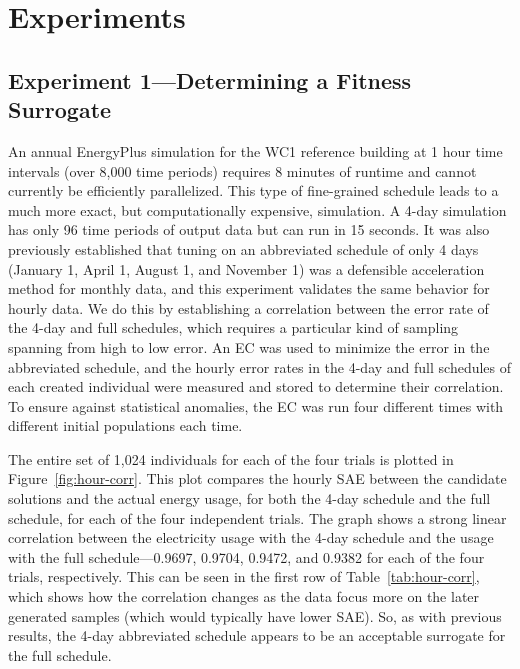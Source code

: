 \documentclass[preprint, review, 12pt]{elsarticle}
\begin{document}
\section{Experiments}
\label{sec:hourly}

\subsection{Experiment 1---Determining a Fitness Surrogate}
\label{sub:experiment1}
An annual EnergyPlus simulation for the WC1 reference building at 1 hour time intervals (over 8,000 time periods) requires 8 minutes of runtime and cannot currently be efficiently parallelized. This type of fine-grained schedule leads to a much more exact, but computationally expensive, simulation. A 4-day simulation has only 96 time periods of output data but can run in 15 seconds. It was also previously established \cite{cit:garrett2013} that tuning on an abbreviated schedule of only 4 days (January 1, April 1, August 1, and November 1) was a defensible acceleration method for monthly data, and this experiment validates the same behavior for hourly data. We do this by establishing a correlation between the error rate of the 4-day and full schedules, which requires a particular kind of sampling spanning from high to low error. An EC was used to minimize the error in the abbreviated schedule, and the hourly error rates in the 4-day and full schedules of each created individual were measured and stored to determine their correlation. To ensure against statistical anomalies, the EC was run four different times with different initial populations each time.

The entire set of 1,024 individuals for each of the four trials is plotted in Figure~\ref{fig:hour-corr}. This plot compares the hourly SAE between the candidate solutions and the actual energy usage, for both the 4-day schedule and the full schedule, for each of the four independent trials. The graph shows a strong linear correlation between the electricity usage with the 4-day schedule and the usage with the full schedule---0.9697, 0.9704, 0.9472, and 0.9382 for each of the four trials, respectively. This can be seen in the first row of Table~\ref{tab:hour-corr}, which shows how the correlation changes as the data focus more on the later generated samples (which would typically have lower SAE). So, as with previous results, the 4-day abbreviated schedule appears to be an acceptable surrogate for the full schedule. 
\end{document}
